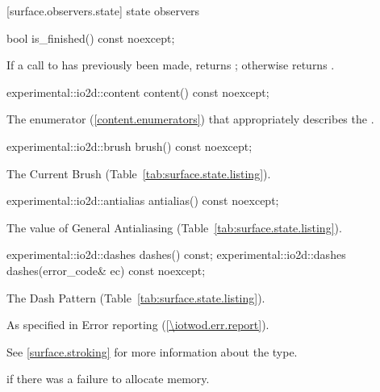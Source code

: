  [surface.observers.state] { state observers}

\begin{itemdecl}
bool is_finished() const noexcept;
\end{itemdecl}
\begin{itemdescr}
\pnum
\returns
If a call to  has previously been made, returns ; otherwise returns .
\end{itemdescr}

\begin{itemdecl}
experimental::io2d::content content() const noexcept;
\end{itemdecl}
\begin{itemdescr}
\pnum
\returns
The  enumerator (\ref{content.enumerators}) that appropriately describes the \underlyingsurface.
\end{itemdescr}

\begin{itemdecl}
experimental::io2d::brush brush() const noexcept;
\end{itemdecl}
\begin{itemdescr}
\pnum
\returns
The Current Brush (Table~\ref{tab:surface.state.listing}).
\end{itemdescr}

\begin{itemdecl}
experimental::io2d::antialias antialias() const noexcept;
\end{itemdecl}
\begin{itemdescr}
\pnum
\returns
The value of General Antialiasing (Table~\ref{tab:surface.state.listing}).
\end{itemdescr}

\begin{itemdecl}
experimental::io2d::dashes dashes() const;
experimental::io2d::dashes dashes(error_code& ec) const noexcept;
\end{itemdecl}
\begin{itemdescr}
\pnum
\returns
The Dash Pattern (Table~\ref{tab:surface.state.listing}).

\pnum
\throws
As specified in Error reporting (\ref{\iotwod.err.report}).

\pnum
\remarks
See \ref{surface.stroking} for more information about the  type.

\pnum
\errors
{} if there was a failure to allocate memory.
\end{itemdescr}

